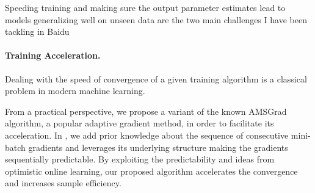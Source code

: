 \documentclass[twoside,11pt]{article}
\begin{document}
Speeding training and making sure the output parameter estimates lead to models generalizing well on unseen data are the two main challenges I have been tackling in Baidu

\vspace{0.08in}
\paragraph{Training Acceleration.} 
Dealing with the speed of convergence of a given training algorithm is a classical problem in modern machine learning.

From a practical perspective, we propose a variant of the known AMSGrad algorithm, a popular adaptive gradient method, in order to facilitate its acceleration.
In \citep{kun2020}, we add prior knowledge about the sequence of consecutive mini-batch gradients and leverages its underlying structure making the gradients sequentially predictable. 
By exploiting the predictability and ideas from optimistic online learning, our proposed algorithm accelerates the convergence and increases sample efficiency.

\vspace{0.08in}
\end{document}
